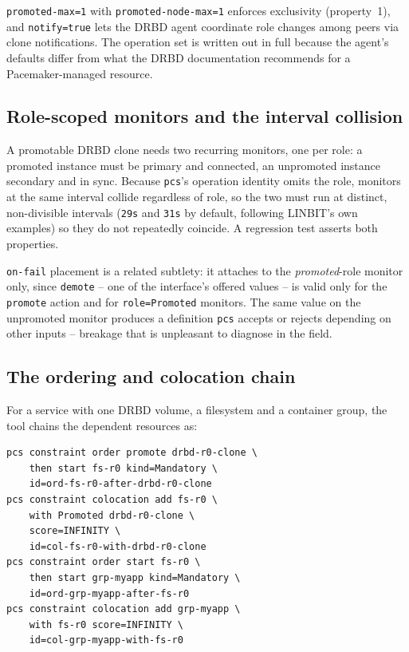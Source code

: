 \documentclass{webofc}
\begin{document}
\texttt{promoted-max=1} with \texttt{promoted-node-max=1} enforces
exclusivity (property~1), and \texttt{notify=true} lets the DRBD agent
coordinate role changes among peers via clone notifications. The
operation set is written out in full because the agent's defaults differ
from what the DRBD documentation recommends for a Pacemaker-managed
resource.

\subsection{Role-scoped monitors and the interval collision}
\label{sec:monitor}

A promotable DRBD clone needs two recurring monitors, one per role: a
promoted instance must be primary and connected, an unpromoted instance
secondary and in sync. Because \texttt{pcs}'s operation identity omits
the role, monitors at the same interval collide regardless of role, so
the two must run at distinct, non-divisible intervals (\texttt{29s} and
\texttt{31s} by default, following LINBIT's own examples) so they do not
repeatedly coincide. A regression test asserts both properties.

\texttt{on-fail} placement is a related subtlety: it attaches to the
\emph{promoted}-role monitor only, since \texttt{demote} -- one of the
interface's offered values -- is valid only for the \texttt{promote}
action and for \texttt{role=Promoted} monitors. The same value on the
unpromoted monitor produces a definition \texttt{pcs} accepts or rejects
depending on other inputs -- breakage that is unpleasant to diagnose in
the field.

\subsection{The ordering and colocation chain}

For a service with one DRBD volume, a filesystem and a container group,
the tool chains the dependent resources as:

\begin{scriptsize}
\begin{verbatim}
pcs constraint order promote drbd-r0-clone \
    then start fs-r0 kind=Mandatory \
    id=ord-fs-r0-after-drbd-r0-clone
pcs constraint colocation add fs-r0 \
    with Promoted drbd-r0-clone \
    score=INFINITY \
    id=col-fs-r0-with-drbd-r0-clone
pcs constraint order start fs-r0 \
    then start grp-myapp kind=Mandatory \
    id=ord-grp-myapp-after-fs-r0
pcs constraint colocation add grp-myapp \
    with fs-r0 score=INFINITY \
    id=col-grp-myapp-with-fs-r0
\end{verbatim}
\end{scriptsize}
\end{document}
